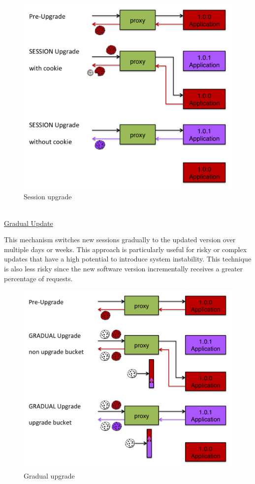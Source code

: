 \documentclass[a4paper,11pt,twoside]{report}
\begin{document}
   
\begin{figure}[!ht]
  \centering
     \includegraphics[scale=0.30]{session_upgrade}
  \caption{Session upgrade}
  \label{session_upgrade}
\end{figure}

\noindent\\
\underline{Gradual Update}

\noindent
This mechanism switches new sessions gradually to the updated version over multiple days or weeks. This approach is particularly useful for risky or complex updates that have a high potential to introduce system instability. This technique is also less risky since the new software version incrementally receives a greater percentage of requests.

   
\begin{figure}[!ht]
  \centering
     \includegraphics[scale=0.30]{gradual_upgrade}
  \caption{Gradual upgrade}
  \label{gradual_upgrade}
\end{figure}
\end{document}
